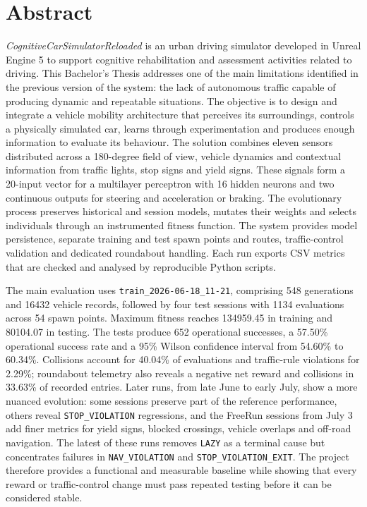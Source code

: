 \cleardoublepage%
\chapter*{Abstract}

\textit{CognitiveCarSimulatorReloaded} is an urban driving simulator developed in Unreal Engine 5 to support cognitive rehabilitation and assessment activities related to driving. This Bachelor's Thesis addresses one of the main limitations identified in the previous version of the system: the lack of autonomous traffic capable of producing dynamic and repeatable situations. The objective is to design and integrate a vehicle mobility architecture that perceives its surroundings, controls a physically simulated car, learns through experimentation and produces enough information to evaluate its behaviour. The solution combines eleven sensors distributed across a 180-degree field of view, vehicle dynamics and contextual information from traffic lights, stop signs and yield signs. These signals form a 20-input vector for a multilayer perceptron with 16 hidden neurons and two continuous outputs for steering and acceleration or braking. The evolutionary process preserves historical and session models, mutates their weights and selects individuals through an instrumented fitness function. The system provides model persistence, separate training and test spawn points and routes, traffic-control validation and dedicated roundabout handling. Each run exports CSV metrics that are checked and analysed by reproducible Python scripts.

The main evaluation uses \texttt{train\_2026-06-18\_11-21}, comprising 548 generations and 16432 vehicle records, followed by four test sessions with 1134 evaluations across 54 spawn points. Maximum fitness reaches 134959.45 in training and 80104.07 in testing. The tests produce 652 operational successes, a 57.50\% operational success rate and a 95\% Wilson confidence interval from 54.60\% to 60.34\%. Collisions account for 40.04\% of evaluations and traffic-rule violations for 2.29\%; roundabout telemetry also reveals a negative net reward and collisions in 33.63\% of recorded entries. Later runs, from late June to early July, show a more nuanced evolution: some sessions preserve part of the reference performance, others reveal \texttt{STOP\_VIOLATION} regressions, and the FreeRun sessions from July 3 add finer metrics for yield signs, blocked crossings, vehicle overlaps and off-road navigation. The latest of these runs removes \texttt{LAZY} as a terminal cause but concentrates failures in \texttt{NAV\_VIOLATION} and \texttt{STOP\_VIOLATION\_EXIT}. The project therefore provides a functional and measurable baseline while showing that every reward or traffic-control change must pass repeated testing before it can be considered stable.
